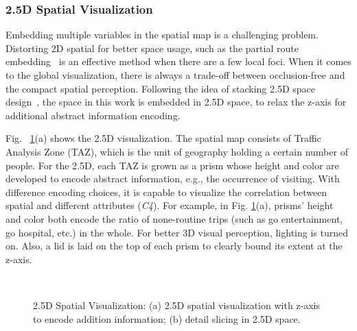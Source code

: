 \documentclass{ieeeaccess}
\begin{document}
\subsubsection{2.5D Spatial Visualization}
\label{subsec:25D}


Embedding multiple variables in the spatial map is a challenging problem. Distorting 2D spatial for better space usage, such as the partial route embedding~\cite{sun2016embedding} is an effective method when there are a few local foci. When it comes to the global visualization, there is always a trade-off between occlusion-free and the compact spatial perception. Following the idea of stacking 2.5D space design~\cite{Tominski2012_stacking}, the space in this work is embedded in 2.5D space, to relax the z-axis for additional abstract information encoding.

Fig. ~\ref{fig:2.5D}(a) shows the 2.5D visualization. The spatial map consists of Traffic Analysis Zone (TAZ), which is the unit of geography holding a certain number of people. For the 2.5D, each TAZ is grown as a prism whose height and color are developed to encode abstract information, e.g., the occurrence of visiting. With difference encoding choices, it is capable to visualize the correlation between spatial and different attributes (\textit{C4}). For example, in Fig. \ref{fig:2.5D}(a), prisms' height and color both encode the ratio of none-routine trips (such as go entertainment, go hospital, etc.) in the whole. For better 3D visual perception, lighting is turned on. Also, a lid is laid on the top of each prism to clearly bound its extent at the z-axis.

\begin{figure}
    \centering
    \label{1a}\hfill
    \label{1b}\\
\caption{2.5D Spatial Visualization: (a) 2.5D spatial visualization with z-axis to encode addition information; (b) detail slicing in 2.5D space.}
\label{fig:2.5D}
\end{figure}
\end{document}
